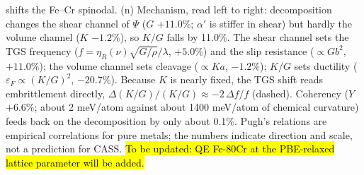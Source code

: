 \documentclass[final,3p,times]{elsarticle}
\DeclareRobustCommand{\upd}[1]{{\sethlcolor{yellow}\hl{To be updated: #1}}}
\begin{document}
shifts the Fe--Cr spinodal. (n) Mechanism, read left to right: decomposition changes the shear channel of $\Psi$ ($G$ $+11.0\%$; $\alpha'$ is stiffer in shear) but hardly the volume channel ($K$ $-1.2\%$), so $K/G$ falls by 11.0\%. The shear channel sets the TGS frequency ($f=\eta_R(\nu)\sqrt{G/\rho}/\lambda$, $+5.0\%$) and the slip resistance ($\propto Gb^2$, $+11.0\%$); the volume channel sets cleavage ($\propto Ka$, $-1.2\%$); $K/G$ sets ductility ($\varepsilon_F\propto(K/G)^2$, $-20.7\%$). Because $K$ is nearly fixed, the TGS shift reads embrittlement directly, $\Delta(K/G)/(K/G)\approx-2\,\Delta f/f$ (dashed). Coherency ($Y$ $+6.6\%$; about 2 meV/atom against about 1400 meV/atom of chemical curvature) feeds back on the decomposition by only about 0.1\%. Pugh's relations are empirical correlations for pure metals; the numbers indicate direction and scale, not a prediction for CASS. \upd{QE Fe-80Cr at the PBE-relaxed lattice parameter will be added.}
\clearpage
\end{document}
